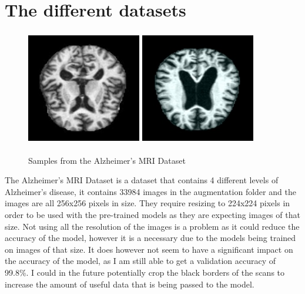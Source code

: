 \documentclass[]{final_report}
\begin{document}
\section{The different datasets}

\begin{figure}[ht!]
  \centering
  \includegraphics[width=50mm,height=50mm]{images/moderateDemented.jpg}
  \includegraphics[width=50mm,height=50mm]{images/mildDemented.jpg}
  \caption{Samples from the Alzheimer's MRI Dataset\cite{AlzheimersDataset}}
\end{figure}

The Alzheimer's MRI Dataset is a dataset that contains 4 different levels of Alzheimer's disease,
it contains 33984 images in the augmentation folder and the images are all 256x256 pixels in size.
They require resizing to 224x224 pixels in order to be used with the pre-trained models as they are expecting images of that size.
Not using all the resolution of the images is a problem as it could reduce the accuracy of the model,
however it is a necessary due to the models being trained on images of that size.
It does however not seem to have a significant impact on the accuracy of the model, as I am still able to get a validation accuracy of 99.8\%.
I could in the future potentially crop the black borders of the scans to increase the amount of useful data that is being passed to the model.
\end{document}
